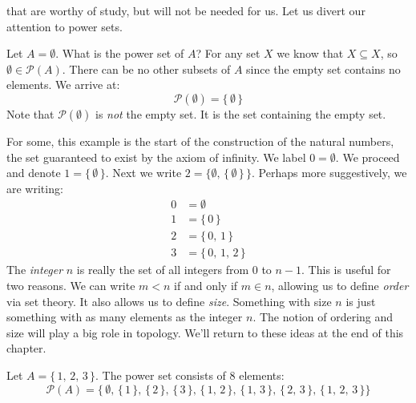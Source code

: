             that are worthy of study, but will not be needed for us. Let us
            divert our attention to power sets.
            \begin{example}
                Let $A=\emptyset$. What is the power set of $A$? For any set
                $X$ we know that $X\subseteq{X}$, so
                $\emptyset\in\mathcal{P}(A)$. There can be no other subsets of
                $A$ since the empty set contains no elements. We arrive at:
                \begin{equation}
                    \mathcal{P}(\emptyset)=\{\,\emptyset\,\}
                \end{equation}
                Note that $\mathcal{P}(\emptyset)$ is \textit{not} the empty
                set. It is the set containing the empty set.
            \end{example}
            For some, this example is the start of the construction of the
            natural numbers, the set guaranteed to exist by the axiom of
            infinity. We label $0=\emptyset$. We proceed and denote
            $1=\{\,\emptyset\,\}$. Next we write
            $2=\{\emptyset,\,\{\,\emptyset\,\}\,\}$. Perhaps more suggestively,
            we are writing:
            \begin{align}
                0&=\emptyset\\
                1&=\{\,0\,\}\\
                2&=\{\,0,\,1\,\}\\
                3&=\{\,0,\,1,\,2\,\}
            \end{align}
            The \textit{integer} $n$ is really the set of all integers from $0$
            to $n-1$. This is useful for two reasons. We can write
            $m<n$ if and only if $m\in{n}$, allowing us to define
            \textit{order} via set theory. It also allows us to define
            \textit{size}. Something with size $n$ is just something with as
            many elements as the integer $n$. The notion of ordering and size
            will play a big role in topology. We'll return to these ideas at
            the end of this chapter.
            \begin{example}
                Let $A=\{\,1,\,2,\,3\,\}$. The power set consists of $8$
                elements:
                \begin{equation}
                    \mathcal{P}(A)=\big\{\,\emptyset,\,\{\,1\,\},\,
                        \{\,2\,\},\,\{\,3\,\},\,
                        \{\,1,\,2\,\},\,\{\,1,\,3\,\},\,\{\,2,\,3\,\},\,
                        \{\,1,\,2,\,3\,\}
                    \big\}
                \end{equation}
            \end{example}

